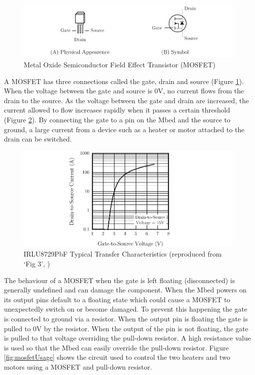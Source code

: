 			\begin{figure}
				\includegraphics[width=1\textwidth]{diagrams/mosfetDiagram.pdf}
				\caption{Metal Oxide Semiconductor Field Effect Transistor (MOSFET)}
				\label{fig:mosfetDiagram}
			\end{figure}
			
			A MOSFET has three connections called the gate, drain and source
			(Figure \ref{fig:mosfetDiagram}). When the voltage between the gate and
			source is 0V, no current flows from the drain to the source. As the
			voltage between the gate and drain are increased, the current allowed to
			flow increases rapidly when it passes a certain threshold (Figure
			\ref{fig:mosfetPerformance}). By connecting the gate to a pin on the
			Mbed and the source to ground, a large current from a device such as a
			heater or motor attached to the drain can be switched.
			
			\begin{figure}
				\includegraphics[width=1\textwidth]{diagrams/mosfetPerformance.pdf}
				\caption{IRLU8729PbF Typical Transfer Characteristics (reproduced from
				`Fig 3', \cite{MOSFET})}
				\label{fig:mosfetPerformance}
			\end{figure}
			
			The behaviour of a MOSFET when the gate is left floating (disconnected) is
			generally undefined and can damage the component. When the Mbed powers on
			its output pins default to a floating state which could cause a MOSFET to
			unexpectedly switch on or become damaged. To prevent this happening the
			gate is connected to ground via a resistor. When the output pin is
			floating the gate is pulled to 0V by the resistor. When the output of the
			pin is not floating, the gate is pulled to that voltage overriding the
			pull-down resistor. A high resistance value is used so that the Mbed can
			easily override the pull-down resistor. Figure \ref{fig:mosfetUsage} shows
			the circuit used to control the two heaters and two motors using a MOSFET
			and pull-down resistor.
			
